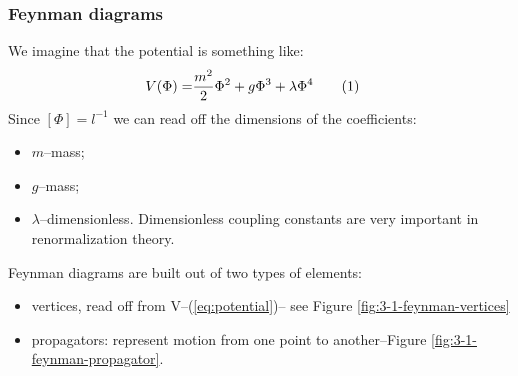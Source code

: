 \documentclass[]{article}
\newcommand\numberthis{\addtocounter{equation}{1}\tag{\theequation}}
\begin{document}
\subsubsection{Feynman diagrams}

We imagine that the potential is something like:
\begin{align*}
	V(\Phi) =& \frac{m^2}{2} \Phi^2 + g \Phi^3 + \lambda \Phi^4 \numberthis \label{eq:potential}
\end{align*}
Since $[\Phi] = l^{-1}$ we can read off the dimensions of the coefficients:
\begin{itemize}
	\item $m$--mass;
	\item $g$--mass;
	\item $\lambda$--dimensionless. Dimensionless coupling constants are very important in renormalization theory.
\end{itemize}

Feynman diagrams are built out of two types of elements:
\begin{itemize}
	\item vertices, read off from V--(\ref{eq:potential})-- see Figure \ref{fig:3-1-feynman-vertices}
	\item propagators: represent motion from one point to another--Figure \ref{fig:3-1-feynman-propagator}.
\end{itemize}
\end{document}
